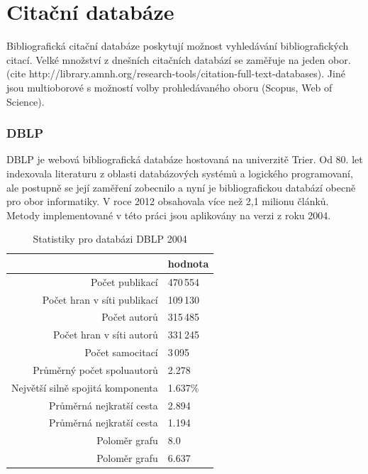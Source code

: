 \documentclass[12pt,titlepage]{report}
\begin{document}
\chapter{Citační databáze}
Bibliografická citační databáze poskytují možnost vyhledávání bibliografických
citací. Velké množství z dnešních citačních databází se zaměřuje na jeden obor.
(cite http://library.amnh.org/research-tools/citation-full-text-databases).
Jiné jsou multioborové s možností volby prohledávaného oboru (Scopus, Web of
Science).

\subsection{DBLP}
DBLP \cite{DBLP} je webová bibliografická databáze hostovaná na univerzitě
Trier. Od 80.  let indexovala literaturu z oblasti databázových systémů a
logického programovaní, ale postupně se její zaměření zobecnilo a nyní je
bibliografickou databází obecně pro obor informatiky. 
V roce 2012 obsahovala více než 2,1 milionu článků. Metody implementované v
této práci jsou aplikovány na verzi z roku 2004. 

\begin{table}[!ht]
\begin{center}
\begin{tabular}{r|l}
\toprule
& hodnota \\
\midrule
Počet publikací & 470\,554 \\
Počet hran v síti publikací & 109\,130 \\
Počet autorů & 315\,485 \\
Počet hran v síti autorů & 331\,245 \\
Počet samocitací & 3\,095 \\
Průměrný počet spoluautorů & 2.278 \\
Největší silně spojitá komponenta & 1.637\% \\
Průměrná nejkratší cesta\footnotemark[1] & 2.894 \\
Průměrná nejkratší cesta\footnotemark[2] & 1.194 \\
Poloměr grafu\footnotemark[1] & 8.0 \\
Poloměr grafu\footnotemark[2] & 6.637 \\
\bottomrule
\end{tabular}
\caption{Statistiky pro databázi DBLP 2004}
\label{tab:dblpstat}
\end{center}
\end{table}
\end{document}
